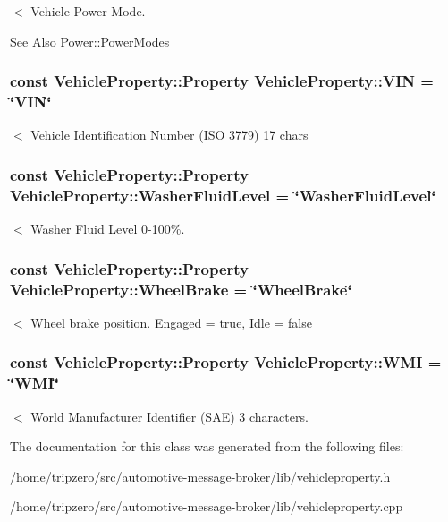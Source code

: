 $<$ Vehicle Power Mode. \begin{DoxySeeAlso}{See Also}
Power\-::\-Power\-Modes 
\end{DoxySeeAlso}
\hypertarget{classVehicleProperty_ae72c1c7de185f330862c62dfb9d93a34}{
\subsubsection[{V\-I\-N}]{\setlength{\rightskip}{0pt plus 5cm}const Vehicle\-Property\-::\-Property Vehicle\-Property\-::\-V\-I\-N = \char`\"{}V\-I\-N\char`\"{}\hspace{0.3cm}{\ttfamily [static]}}}\label{classVehicleProperty_ae72c1c7de185f330862c62dfb9d93a34}
$<$ Vehicle Identification Number (I\-S\-O 3779) 17 chars \hypertarget{classVehicleProperty_a37c8c7e827625705d2f560ab53ee8d23}{
\subsubsection[{Washer\-Fluid\-Level}]{\setlength{\rightskip}{0pt plus 5cm}const Vehicle\-Property\-::\-Property Vehicle\-Property\-::\-Washer\-Fluid\-Level = \char`\"{}Washer\-Fluid\-Level\char`\"{}\hspace{0.3cm}{\ttfamily [static]}}}\label{classVehicleProperty_a37c8c7e827625705d2f560ab53ee8d23}
$<$ Washer Fluid Level 0-\/100\%. \hypertarget{classVehicleProperty_ad4f1ec038bee5ef30fbf8308aaba2794}{
\subsubsection[{Wheel\-Brake}]{\setlength{\rightskip}{0pt plus 5cm}const Vehicle\-Property\-::\-Property Vehicle\-Property\-::\-Wheel\-Brake = \char`\"{}Wheel\-Brake\char`\"{}\hspace{0.3cm}{\ttfamily [static]}}}\label{classVehicleProperty_ad4f1ec038bee5ef30fbf8308aaba2794}
$<$ Wheel brake position. Engaged = true, Idle = false \hypertarget{classVehicleProperty_a32f980d900d97cf94171ea9fa25408e0}{
\subsubsection[{W\-M\-I}]{\setlength{\rightskip}{0pt plus 5cm}const Vehicle\-Property\-::\-Property Vehicle\-Property\-::\-W\-M\-I = \char`\"{}W\-M\-I\char`\"{}\hspace{0.3cm}{\ttfamily [static]}}}\label{classVehicleProperty_a32f980d900d97cf94171ea9fa25408e0}
$<$ World Manufacturer Identifier (S\-A\-E) 3 characters. 

The documentation for this class was generated from the following files\-:\begin{DoxyCompactItemize}
\item 
/home/tripzero/src/automotive-\/message-\/broker/lib/vehicleproperty.\-h\item 
/home/tripzero/src/automotive-\/message-\/broker/lib/vehicleproperty.\-cpp\end{DoxyCompactItemize}
